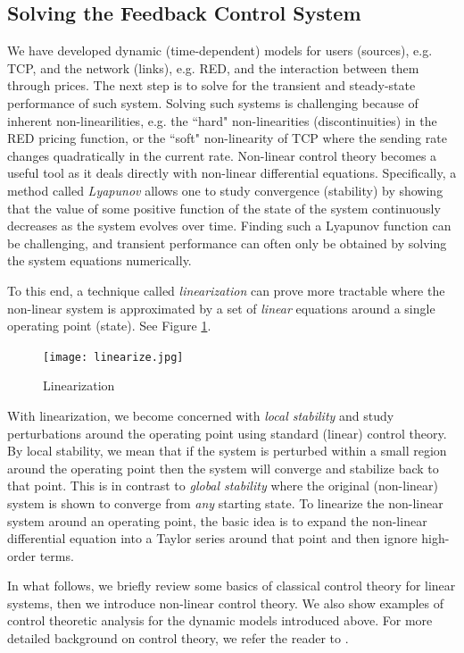 \documentclass{article}
\begin{document}
\subsection{Solving the Feedback Control System}

We have developed dynamic (time-dependent) models for users (sources), e.g. TCP, and the network (links), e.g. RED,
and the interaction between them through prices.
The next step is to solve for the transient and steady-state performance of such system.
Solving such systems is challenging because of inherent non-linearilities,
e.g. the ``hard" non-linearities (discontinuities) in the RED pricing function,
or the ``soft" non-linearity of TCP where the sending rate changes quadratically in the current rate.
Non-linear control theory becomes a useful tool as it deals directly with non-linear differential equations.
Specifically, a method called {\em Lyapunov} \cite{Ogata:2010} allows one to study convergence (stability) by showing that the value of some positive function of the state  of the system continuously decreases as the system evolves over time.
Finding such a Lyapunov function can be challenging, and 
transient performance can often only be obtained by solving the system equations numerically.

To this end, a technique called {\em linearization} can prove more tractable
where the non-linear system is approximated by a set of {\em linear} equations around a single operating point (state).
See Figure \ref{fig:linearize}.
\begin{figure}[htbp]
   \centering
   \texttt{[image: linearize.jpg]} %
   \caption{Linearization}
   \label{fig:linearize}
\end{figure}
With linearization, we become concerned with {\em local stability} and study perturbations around the operating point
using standard (linear) control theory. 
By local stability, we mean that if the system is perturbed within a small region around the operating point 
then the system will converge and stabilize back to that point.
This is in contrast to {\em global stability} where the original (non-linear) system is shown to 
converge from {\em any} starting state.
To linearize the non-linear system around an operating point,
the basic idea is to expand the non-linear differential equation into 
a Taylor series around that point and then ignore high-order terms.

In what follows, we briefly review some basics of classical control theory for linear systems,
then we introduce non-linear control theory. We also show examples of control theoretic analysis for 
the dynamic models introduced above.
For more detailed background on control theory,
we refer the reader to \cite{Ogata:2010,Keshav:2010,Lu:2001}.
\end{document}
